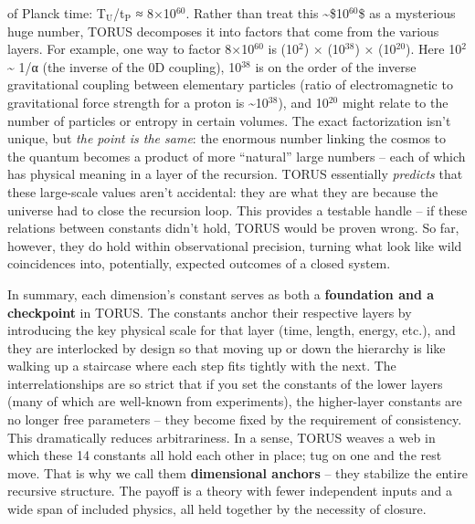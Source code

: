 \documentclass[]{article}
\newcommand{\subscript}[1]{\ensuremath{_{\mathrm{#1}}}}
\newcommand{\superscript}[1]{\ensuremath{^{\mathrm{#1}}}}
\begin{document}
\begin{itemize}
  of Planck time:
  T\subscript{U}/t\subscript{P}
  ≈ 8×10\superscript{60}​. Rather than treat this \textasciitilde{}\$10\superscript{60}\$ as
  a mysterious huge number, TORUS decomposes it into factors that come
  from the various layers​. For example, one way to factor 8×10\superscript{60} is
  (10\superscript{2}) × (10\superscript{38}) × (10\superscript{20})​. Here 10\superscript{2} \textasciitilde{}
  1/α (the inverse of the 0D coupling), 10\superscript{38} is on the order of the
  inverse gravitational coupling between elementary particles (ratio of
  electromagnetic to gravitational force strength for a proton is
  \textasciitilde{}10\superscript{38}), and 10\superscript{20} might relate to the number of
  particles or entropy in certain volumes​. The exact factorization
  isn't unique, but \emph{the point is the same}: the enormous number
  linking the cosmos to the quantum becomes a product of more
  ``natural'' large numbers -- each of which has physical meaning in a
  layer of the recursion​. TORUS essentially \emph{predicts} that these
  large-scale values aren't accidental: they are what they are because
  the universe had to close the recursion loop. This provides a testable
  handle -- if these relations between constants didn't hold, TORUS
  would be proven wrong​. So far, however, they do hold within
  observational precision, turning what look like wild coincidences
  into, potentially, expected outcomes of a closed system.
\end{itemize}

In summary, each dimension's constant serves as both a
\textbf{foundation and a checkpoint} in TORUS. The constants anchor
their respective layers by introducing the key physical scale for that
layer (time, length, energy, etc.), and they are interlocked by design
so that moving up or down the hierarchy is like walking up a staircase
where each step fits tightly with the next. The interrelationships are
so strict that if you set the constants of the lower layers (many of
which are well-known from experiments), the higher-layer constants are
no longer free parameters -- they become fixed by the requirement of
consistency​. This dramatically reduces arbitrariness. In a sense, TORUS
weaves a web in which these 14 constants all hold each other in place;
tug on one and the rest move. That is why we call them
\textbf{dimensional anchors} -- they stabilize the entire recursive
structure. The payoff is a theory with fewer independent inputs and a
wide span of included physics, all held together by the necessity of
closure.
\end{document}
